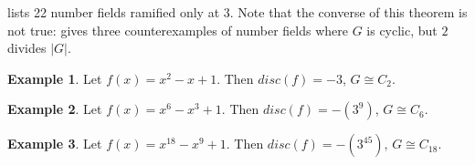 \documentclass[12pt]{extarticle}
\newcommand{\<}{\langle}
\renewcommand{\>}{\rangle}
\theoremstyle{definition}
\newtheorem*{example}{Example}
\begin{document}
\cite{JONE2} lists 22 number fields ramified only at 3. Note that the converse of this theorem is not true: \cite{JONE2} gives three counterexamples of number fields where $G$ is cyclic, but $2$ divides $|G|$. 
\begin{example}
Let $f(x) = x^2-x+1$. Then $disc(f) = -3$, $G \cong C_2$.
\end{example}
\begin{example}
Let $f(x) = x^6-x^3+1$. Then $disc(f) = -(3^9)$, $G \cong C_6$.
\end{example}
\begin{example}
Let $f(x) = x^{18}-x^9+1$. Then $disc(f) = -(3^{45})$, $G \cong C_{18}$.
\end{example}





% 

\end{document}
